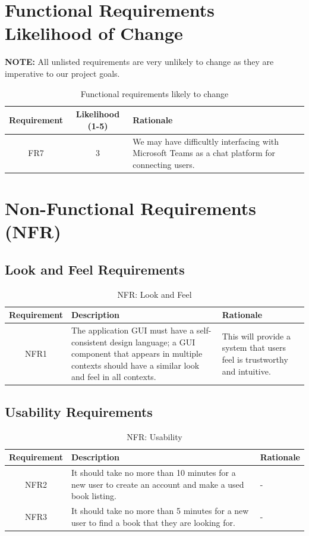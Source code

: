 \documentclass[fullpage]{article}
\begin{document}
\section{Functional Requirements Likelihood of Change}

\textbf{NOTE:} All unlisted requirements are very unlikely to change as they are imperative to our project goals.
\begin{table}[h!]
\flushleft
\begin{tabular}{|c|c|p{6cm}|}
\hline
 \rowcolor{lightgray} 
\textbf{Requirement} & \textbf{Likelihood (1-5)} & \textbf{Rationale} \\
\hline
FR7 & 3 & We may have difficultly interfacing with Microsoft Teams as a chat platform for connecting users. \\
\hline
\end{tabular}
\caption{Functional requirements likely to change}
\end{table}


\section{Non-Functional Requirements (NFR)}


\subsection{Look and Feel Requirements}
\begin{table}[h!]
\flushleft
\begin{tabular}{|c|p{6cm}|p{6cm}|}
\hline
 \rowcolor{lightgray} 
\textbf{Requirement} & \textbf{Description} & \textbf{Rationale} \\
\hline
NFR1 &The application GUI must have a self-consistent design language; a GUI component that appears in multiple contexts should have a similar look and feel in all contexts.& This will provide a system that users feel is trustworthy and intuitive.\\
\hline
\end{tabular}
\caption{NFR: Look and Feel}
\end{table}


\subsection{Usability Requirements}
\begin{table}[h!]
\flushleft
\begin{tabular}{|c|p{6cm}|p{6cm}|}
\hline
 \rowcolor{lightgray} 
\textbf{Requirement} & \textbf{Description} & \textbf{Rationale} \\
\hline
NFR2 & It should take no more than 10 minutes for a new user to create an account and make a used book listing. & - \\
\hline
NFR3 & It should take no more than 5 minutes for a new user to find a book that they are looking for. & -\\
\hline
\end{tabular}
\caption{NFR: Usability}
\end{table}
\end{document}
